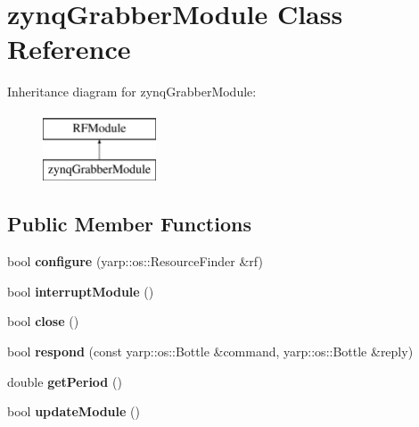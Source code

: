 \hypertarget{classzynqGrabberModule}{\section{zynq\-Grabber\-Module Class Reference}
\label{classzynqGrabberModule}
}
Inheritance diagram for zynq\-Grabber\-Module\-:\begin{figure}[H]
\begin{center}
\leavevmode
\includegraphics[height=2.000000cm]{classzynqGrabberModule}
\end{center}
\end{figure}
\subsection*{Public Member Functions}
\begin{DoxyCompactItemize}
\item 
\hypertarget{classzynqGrabberModule_a2733856709df020d264750ce5afbe552}{bool {\bfseries configure} (yarp\-::os\-::\-Resource\-Finder \&rf)}\label{classzynqGrabberModule_a2733856709df020d264750ce5afbe552}

\item 
\hypertarget{classzynqGrabberModule_aa33152e027843920826ea02f323df8dd}{bool {\bfseries interrupt\-Module} ()}\label{classzynqGrabberModule_aa33152e027843920826ea02f323df8dd}

\item 
\hypertarget{classzynqGrabberModule_ae687b7063d3974a71a27a4cae8104480}{bool {\bfseries close} ()}\label{classzynqGrabberModule_ae687b7063d3974a71a27a4cae8104480}

\item 
\hypertarget{classzynqGrabberModule_afb439f66ef1786b6b503597dd6e74f33}{bool {\bfseries respond} (const yarp\-::os\-::\-Bottle \&command, yarp\-::os\-::\-Bottle \&reply)}\label{classzynqGrabberModule_afb439f66ef1786b6b503597dd6e74f33}

\item 
\hypertarget{classzynqGrabberModule_a584429a662fd6eb0b11d77294c1b40a5}{double {\bfseries get\-Period} ()}\label{classzynqGrabberModule_a584429a662fd6eb0b11d77294c1b40a5}

\item 
\hypertarget{classzynqGrabberModule_a53679eefbe74aa164fde84f9381450bc}{bool {\bfseries update\-Module} ()}\label{classzynqGrabberModule_a53679eefbe74aa164fde84f9381450bc}

\end{DoxyCompactItemize}


